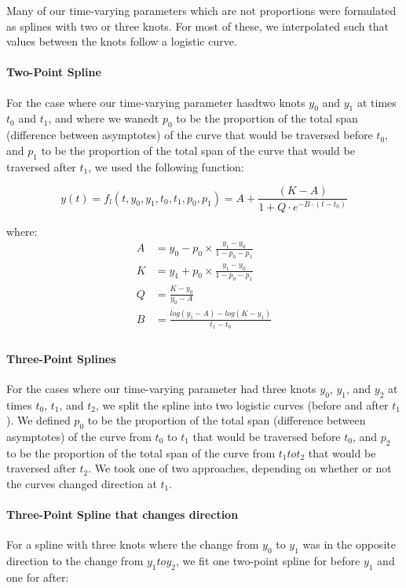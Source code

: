 \documentclass{article}
\begin{document}
Many of our time-varying parameters which are not proportions were formulated as splines with two or three knots. For most of these, we interpolated such that values between the knots follow a logistic curve.

\paragraph{Two-Point Spline} \label{two_point_logistic_spline}

For the case where our time-varying parameter hasdtwo knots $y_0$ and $y_1$ at times $t_0$ and $t_1$, and where we wanedt $p_0$ to be the proportion of the total span (difference between asymptotes) of the curve that would be traversed before $t_0$, and $p_1$ to be the proportion of the total span of the curve that would be traversed after $t_1$, we used the following function:

\begin{equation}
y(t) = f_l(t,y_0,y_1,t_0,t_1,p_0,p_1) = A + \frac{(K - A)}{1 + Q \cdot e^{-B\cdot(t-t_0)}}
\end{equation}

where:
\begin{align}
A &= y_0 - p_0 \times \frac{y_1 - y_0}{1 - p_0 - p_1} \\
K &= y_1 + p_0 \times \frac{y_1 - y_0}{1 - p_0 - p_1}\\
Q &= \frac{K-y_0}{y_0-A}\\
B &= \frac{log(y_1-A) - log(K-y_1)}{t_1 - t_0}\\
\end{align}

\paragraph{Three-Point Splines} \label{logistic_three_point_spline}
For the cases where our time-varying parameter had three knots $y_0$, $y_1$, and $y_2$ at times $t_0$, $t_1$, and $t_2$, we split the spline into two logistic curves (before and after $t_1$). We defined $p_0$ to be the proportion of the total span (difference between asymptotes) of the curve from $t_0$ to $t_1$ that would be traversed before $t_0$, and $p_2$ to be the proportion of the total span of the curve from $t_1 to t_2$ that would be traversed after $t_2$. We took one of two approaches, depending on whether or not the curves changed direction at $t_1$.

\paragraph{Three-Point Spline that changes direction}
For a spline with three knots where the change from $y_0$ to $y_1$ was in the opposite direction to the change from $y_1 to y_2$, we fit one two-point spline for before $y_1$ and one for after:
\end{document}
